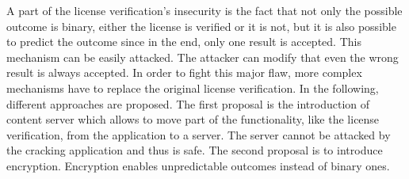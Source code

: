 A part of the license verification's insecurity is the fact that not only the possible outcome is binary, either the license is verified or it is not, but it is also possible to predict the outcome since in the end, only one result is accepted.
This mechanism can be easily attacked.
The attacker can modify that even the wrong result is always accepted.
\newline
In order to fight this major flaw, more complex mechanisms have to replace the original license verification.
In the following, different approaches are proposed.
The first proposal is the introduction of content server which allows to move part of the functionality, like the license verification, from the application to a server.
The server cannot be attacked by the cracking application and thus is safe.
\newline
The second proposal is to introduce encryption.
Encryption enables unpredictable outcomes instead of binary ones.
